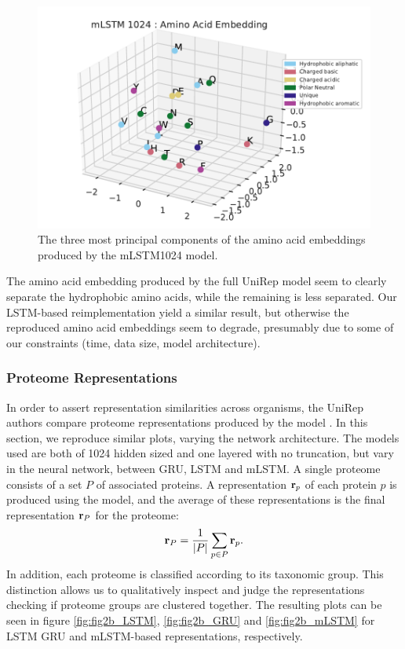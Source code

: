 \documentclass[a4paper,12pt]{article}
\begin{document}
\begin{figure}[H]
    \centering
    \includegraphics[width=\linewidth]{figures/fig2a_mLSTM_1024_no_trunc.pdf}
    \caption{The three most principal components of the amino acid embeddings produced by the mLSTM1024 model.}
    \label{fig:fig2a_mLSTM}
\end{figure}

The amino acid embedding produced by the full UniRep model seem to clearly separate the hydrophobic amino acids, while the remaining is less separated. Our LSTM-based reimplementation yield a similar result, but otherwise the reproduced amino acid embeddings seem to degrade, presumably due to some of our constraints (time, data size, model architecture).

\subsubsection{Proteome Representations}
\label{section:proteome}
In order to assert representation similarities across organisms, the UniRep authors compare proteome representations produced by the model \cite{alley2019unified}. In this section, we reproduce similar plots, varying the network architecture. The models used are both of 1024 hidden sized and one layered with no truncation, but vary in the neural network, between GRU, LSTM and mLSTM. A single proteome consists of a set $P$ of associated proteins. A representation $\mathbf{ r }_p$ of each protein $p$ is produced using the model, and the average of these representations is the final representation $\mathbf{ r }_P$ for the proteome:
\[ \mathbf{ r }_P = \frac{1}{|P|} \sum_{p \in P} \mathbf{ r }_p. \]
In addition, each proteome is classified according to its taxonomic group. This distinction allows us to qualitatively inspect and judge the representations checking if proteome groups are clustered together. The resulting plots can be seen in figure \ref{fig:fig2b_LSTM}, \ref{fig:fig2b_GRU} and \ref{fig:fig2b_mLSTM} for LSTM GRU and mLSTM-based representations, respectively.
\end{document}

